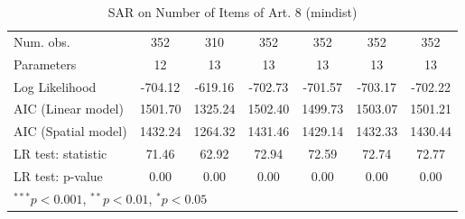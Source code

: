 \begin{table}[!h]
\begin{center}
\begin{tabular}{l c c c c c c }
\midrule
Num. obs.               & 352          & 310          & 352          & 352          & 352          & 352          \\
Parameters              & 12           & 13           & 13           & 13           & 13           & 13           \\
Log Likelihood          & -704.12      & -619.16      & -702.73      & -701.57      & -703.17      & -702.22      \\
AIC (Linear model)      & 1501.70      & 1325.24      & 1502.40      & 1499.73      & 1503.07      & 1501.21      \\
AIC (Spatial model)     & 1432.24      & 1264.32      & 1431.46      & 1429.14      & 1432.33      & 1430.44      \\
LR test: statistic      & 71.46        & 62.92        & 72.94        & 72.59        & 72.74        & 72.77        \\
LR test: p-value        & 0.00         & 0.00         & 0.00         & 0.00         & 0.00         & 0.00         \\
\bottomrule
\multicolumn{7}{l}{\scriptsize{$^{***}p<0.001$, $^{**}p<0.01$, $^*p<0.05$}}
\end{tabular}
\caption{SAR on Number of Items of Art. 8 (mindist)}
\label{table:coefficients}
\end{center}
\end{table}
